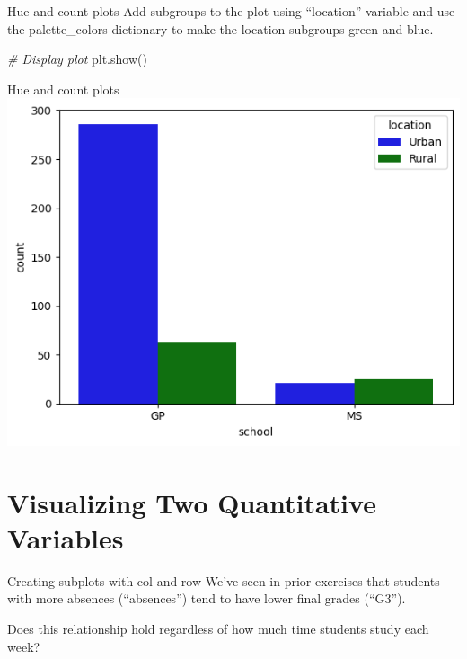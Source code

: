 \documentclass[
  ignorenonframetext,
]{beamer}
\newenvironment{Shaded}{\begin{snugshade}}{\end{snugshade}}
\newcommand{\CommentTok}[1]{\textcolor[rgb]{0.56,0.35,0.01}{\textit{#1}}}
\newcommand{\NormalTok}[1]{#1}
\begin{document}
\begin{frame}[fragile]{Hue and count plots}
\label{hue-and-count-plots-5}
Add subgroups to the plot using ``location'' variable and use the
palette\_colors dictionary to make the location subgroups green and
blue.


\begin{Shaded}
\begin{Highlighting}[]
\CommentTok{\# Display plot}
\NormalTok{plt.show()}
\end{Highlighting}
\end{Shaded}
\end{frame}

\begin{frame}{Hue and count plots}
\label{hue-and-count-plots-6}
\includegraphics{../images/im261.png}
\end{frame}

\section{Visualizing Two Quantitative
Variables}\label{visualizing-two-quantitative-variables}

\begin{frame}{Creating subplots with col and row}
\label{creating-subplots-with-col-and-row}
We've seen in prior exercises that students with more absences
(``absences'') tend to have lower final grades (``G3'').

Does this relationship hold regardless of how much time students study
each week?
\end{frame}
\end{document}
